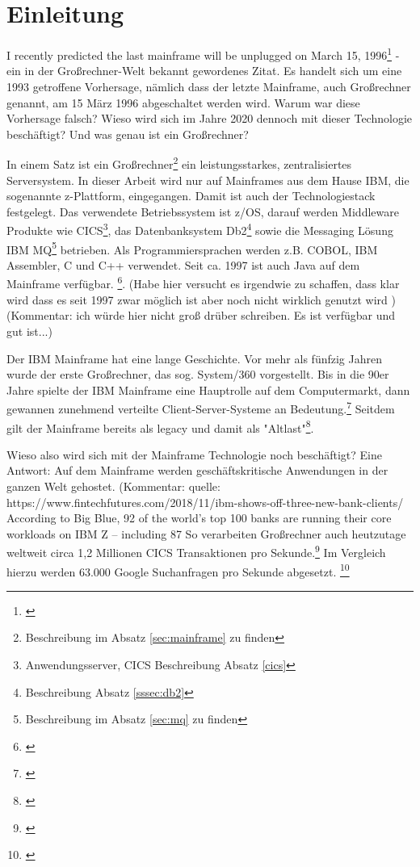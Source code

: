 \chapter{Einleitung}\label{ch:einleitung}
\glqq I recently predicted the last mainframe will be unplugged on March 15, 1996\grqq\footnote{\cite{Alsop.1993}} - ein in der Großrechner-Welt bekannt gewordenes Zitat.
Es handelt sich um eine 1993 getroffene Vorhersage, nämlich dass der letzte Mainframe, auch Großrechner genannt, am 15 März 1996 abgeschaltet werden wird.
Warum war diese Vorhersage falsch? 
Wieso wird sich im Jahre 2020 dennoch mit dieser Technologie beschäftigt? 
Und was genau ist ein Großrechner?

In einem Satz ist ein Großrechner\footnote{Beschreibung im Absatz \ref{sec:mainframe} zu finden} ein leistungsstarkes, zentralisiertes Serversystem.
In dieser Arbeit wird nur auf Mainframes aus dem Hause IBM, die sogenannte z-Plattform, eingegangen.
Damit ist auch der Technologiestack festgelegt.
Das verwendete Betriebssystem ist z/OS, darauf werden Middleware Produkte wie CICS\footnote{Anwendungsserver, CICS Beschreibung Absatz \ref{cics}}, das Datenbanksystem Db2\footnote{ Beschreibung Absatz \ref{sssec:db2}} sowie die Messaging Lösung \glqq IBM MQ\grqq{}\footnote{Beschreibung im Absatz \ref{sec:mq} zu finden} betrieben.
Als Programmiersprachen werden z.B. COBOL, IBM Assembler, C und C++ verwendet. 
Seit ca. 1997 ist auch Java auf dem Mainframe verfügbar. \footnote{\cite{Steegmans.2003}}. (Habe hier versucht es irgendwie zu schaffen, dass klar wird dass es seit 1997 zwar möglich ist aber noch nicht wirklich genutzt wird )
(Kommentar: ich würde hier nicht groß drüber schreiben. Es ist verfügbar und gut ist...)

Der IBM Mainframe hat eine lange Geschichte.
Vor mehr als fünfzig Jahren wurde der erste Großrechner, das sog. \glqq System/360\grqq{} vorgestellt.
Bis in die 90er Jahre spielte der IBM Mainframe eine Hauptrolle auf dem Computermarkt, dann gewannen zunehmend verteilte Client-Server-Systeme an Bedeutung.\footnote{\cite{Ceruzzi.2003}}
Seitdem gilt der Mainframe bereits als \glqq  legacy\grqq{} und damit als "Altlast"\footnote{\cite{legacy.22.2.2020}}.

Wieso also wird sich mit der Mainframe Technologie noch beschäftigt? Eine Antwort: Auf dem Mainframe werden geschäftskritische Anwendungen in der ganzen Welt gehostet. (Kommentar: quelle: https://www.fintechfutures.com/2018/11/ibm-shows-off-three-new-bank-clients/ According to Big Blue, 92 of the world’s top 100 banks are running their core workloads on IBM Z – including 87%
So verarbeiten Großrechner auch heutzutage weltweit circa 1,2 Millionen CICS Transaktionen pro Sekunde.\footnote{\cite{IBM.2019}}
Im Vergleich hierzu werden 63.000 Google Suchanfragen pro Sekunde abgesetzt.  \footnote{\cite{Sullivan.2016}}

